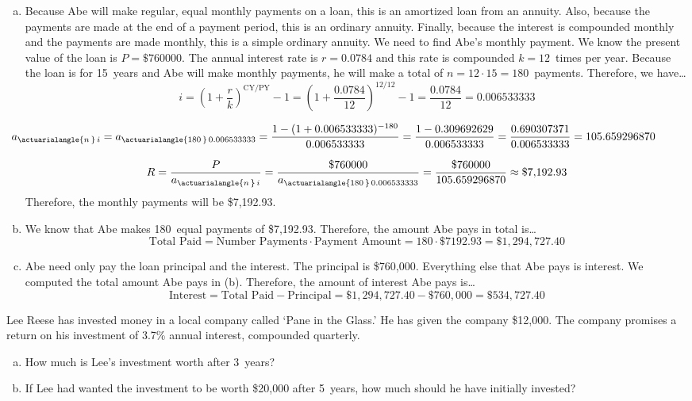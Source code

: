 \documentclass[12pt,letterpaper]{exam}
\begin{document}
\begin{questions}
{\itshape
\sol 
\begin{enumerate}[(a)]
\item Because Abe will make regular, equal monthly payments on a loan, this is an amortized loan from an annuity. Also, because the payments are made at the end of a payment period, this is an ordinary annuity. Finally, because the interest is compounded monthly and the payments are made monthly, this is a simple ordinary annuity. We need to find Abe's monthly payment. We know the present value of the loan is $P= \$760000$. The annual interest rate is $r= 0.0784$ and this rate is compounded $k= 12$~times per year. Because the loan is for 15~years and Abe will make monthly payments, he will make a total of $n= 12 \cdot 15= 180$~payments. Therefore, we have\dots
	\[
	i= \left(1 + \dfrac{r}{k} \right)^{\text{CY}/\text{PY}} - 1= \left(1 + \dfrac{0.0784}{12} \right)^{12/12} - 1= \dfrac{0.0784}{12}= 0.006533333
	\] \par\vspace{0.1cm}
	\[
	\hspace{-1.5cm} a_{\actuarialangle{n\,}\, i}= a_{\actuarialangle{180\,}\, 0.006533333}= \dfrac{1 - (1 + 0.006533333)^{-180}}{0.006533333}= \dfrac{1 - 0.309692629}{0.006533333}= \dfrac{0.690307371}{0.006533333}= 105.659296870
	\] \par\vspace{0.1cm}
	\[
	R= \dfrac{P}{a_{\actuarialangle{n\,}\, i}}= \dfrac{\$760000}{a_{\actuarialangle{180\,}\, 0.006533333}}= \dfrac{\$760000}{105.659296870} \approx \$7,\!192.93
	\]
Therefore, the monthly payments will be \$7,192.93. \pspace

\item We know that Abe makes 180~equal payments of \$7,192.93. Therefore, the amount Abe pays in total is\dots
	\[
	\text{Total Paid}= \text{Number Payments} \cdot \text{Payment Amount}= 180 \cdot \$7192.93= \$1,\!294,\!727.40
	\]

\item Abe need only pay the loan principal and the interest. The principal is \$760,000. Everything else that Abe pays is interest. We computed the total amount Abe pays in (b). Therefore, the amount of interest Abe pays is\dots
	\[
	\text{Interest}= \text{Total Paid} - \text{Principal}= \$1,\!294,\!727.40 - \$760,\!000= \$534,\!727.40
	\]
\end{enumerate}
}



\newpage
\question[10] Lee Reese has invested money in a local company called `Pane in the Glass.' He has given the company \$12,000. The company promises a return on his investment of 3.7\% annual interest, compounded quarterly. 
	\begin{enumerate}[(a)]
	\item How much is Lee's investment worth after 3~years?
	\item If Lee had wanted the investment to be worth \$20,000 after 5~years, how much should he have initially invested? 
	\end{enumerate} \pspace


\end{questions}
\end{document}
